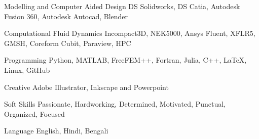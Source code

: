 

\begin{cvskills}

  \cvskill
  {Modelling and Computer Aided Design} %
  {DS Solidworks, DS Catia, Autodesk Fusion 360, Autodesk Autocad, Blender} %

  \cvskill
  {Computational Fluid Dynamics} %
  {Incompact3D, NEK5000, Ansys Fluent, XFLR5, GMSH, Coreform Cubit, Paraview, HPC} %

  \cvskill
  {Programming} %
  {Python, MATLAB, FreeFEM++, Fortran, Julia, C++, LaTeX, Linux, GitHub} %

  \cvskill
  {Creative} %
  {Adobe Illustrator, Inkscape and Powerpoint} %

  \cvskill
  {Soft Skills} %
  {Passionate, Hardworking, Determined, Motivated, Punctual, Organized, Focused} %


  \cvskill
  {Language} %
  {English, Hindi, Bengali} %

\end{cvskills}
